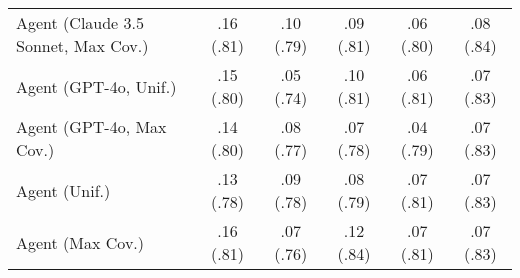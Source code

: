 \begin{table}[h!]
\begin{tabular}{lccccc}
    Agent (Claude 3.5 Sonnet, Max Cov.) & .16 {\small (.81)} & .10 {\small (.79)} & .09 {\small (.81)} & .06 {\small (.80)} & \cellcolor{silver!30}.08 {\small (.84)} \\
    Agent (GPT-4o, Unif.) & .15 {\small (.80)} & .05 {\small (.74)} & .10 {\small (.81)} & .06 {\small (.81)} & .07 {\small (.83)} \\
    Agent (GPT-4o, Max Cov.) & .14 {\small (.80)} & .08 {\small (.77)} & .07 {\small (.78)} & .04 {\small (.79)} & .07 {\small (.83)} \\
    Agent (Unif.) & .13 {\small (.78)} & .09 {\small (.78)} & .08 {\small (.79)} & .07 {\small (.81)} & .07 {\small (.83)} \\
    Agent (Max Cov.) & .16 {\small (.81)} & .07 {\small (.76)} & \cellcolor{silver!30}.12 {\small (.84)} & .07 {\small (.81)} & .07 {\small (.83)} \\
    \bottomrule
    \end{tabular}
\end{table}
